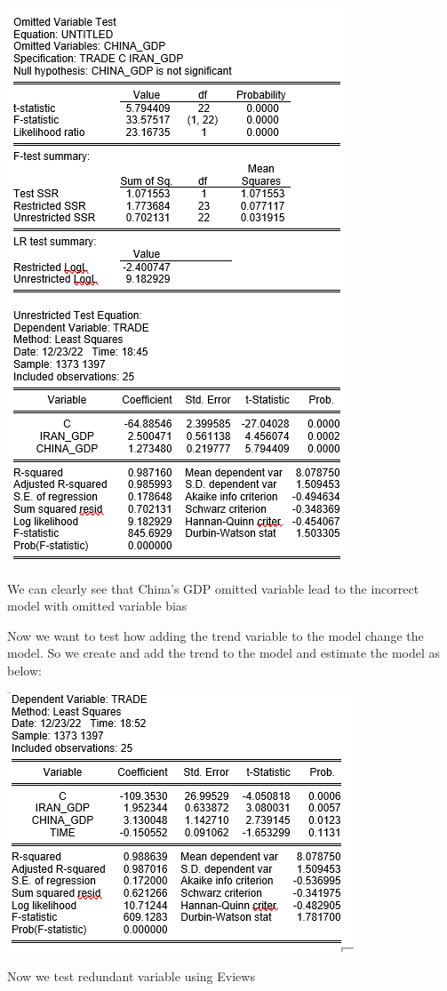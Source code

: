 \documentclass[12pt, letterpaper, twoside]{article}
\begin{document}
        \includegraphics[width=.8\textwidth,height=.8\textwidth,keepaspectratio,center]{22.png}
        
We can clearly see that China’s GDP omitted variable lead to the incorrect model with omitted variable bias

Now we want to test how adding the trend variable to the model change the model. So we create and add the trend to the model and estimate the model as below:

        \includegraphics[width=.6\textwidth,height=.6\textwidth,keepaspectratio,center]{23.png}
        
Now we test redundant variable using Eviews
\end{document}
